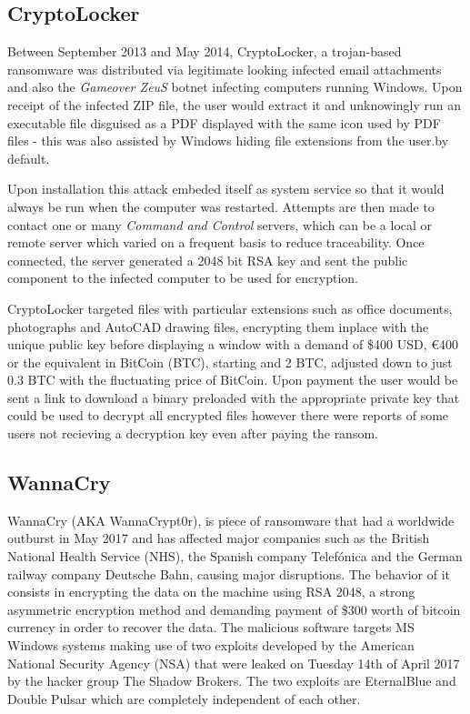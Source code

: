 \documentclass[10pt,a4paper]{article}
\begin{document}
\subsection{CryptoLocker}
Between September 2013 and May 2014, CryptoLocker, a trojan-based ransomware was distributed via legitimate looking infected email attachments and also the \textit{Gameover ZeuS} botnet infecting computers running Windows. Upon receipt of the infected ZIP file, the user would extract it and unknowingly run an executable file disguised as a PDF displayed with the same icon used by PDF files \-- this was also assisted by Windows hiding file extensions from the user.by default.

Upon installation this attack embeded itself as system service so that it would always be run when the computer was restarted. Attempts are then made to contact one or many \textit{Command and Control} servers, which can be a local or remote server which varied on a frequent basis to reduce traceability. Once connected, the server generated a 2048 bit RSA key and sent the public component to the infected computer to be used for encryption.

CryptoLocker targeted files with particular extensions such as office documents, photographs and AutoCAD drawing files, encrypting them inplace with the unique public key before displaying a window with a demand of \$400 USD, \euro400 or the equivalent in BitCoin (BTC), starting and 2 BTC, adjusted down to just 0.3 BTC with the fluctuating price of BitCoin. Upon payment the user would be sent a link to download a binary preloaded with the appropriate private key that could be used to decrypt all encrypted files however there were reports of some users not recieving a decryption key even after paying the ransom.

\subsection{WannaCry}
WannaCry (AKA WannaCrypt0r), is piece of ransomware that had a worldwide outburst in May 2017 and has affected major companies such as the British National Health Service (NHS), the Spanish company Telefónica and the German railway company Deutsche Bahn, causing major disruptions. The behavior of it consists in encrypting the data on the machine using RSA 2048, a strong asymmetric encryption method and demanding payment of \$300 worth of bitcoin currency in order to recover the data. The malicious software targets MS Windows systems making use of two exploits developed by the American National Security Agency (NSA) that were leaked on Tuesday 14th of April 2017 by the hacker group The Shadow Brokers. The two exploits are EternalBlue and Double Pulsar which are completely independent of each other.
\end{document}
